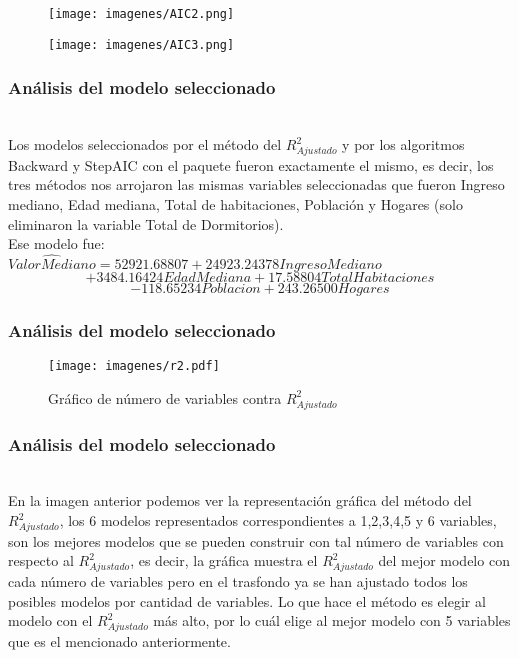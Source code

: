 \documentclass[12pt]{beamer}
\begin{document}
\begin{frame}
\begin{figure}[h]
  \centering
  \texttt{[image: imagenes/AIC2.png]}
\end{figure}
\end{frame}

\begin{frame}
\begin{figure}[h]
  \centering
  \texttt{[image: imagenes/AIC3.png]}
\end{figure}
\end{frame}

\begin{frame}
\frametitle{Análisis del modelo seleccionado}
~\\ Los modelos seleccionados por el método del $R^2_{Ajustado}$ y por los algoritmos Backward y StepAIC con el paquete fueron exactamente el mismo, es decir, los tres métodos nos arrojaron las mismas variables seleccionadas que fueron Ingreso mediano, Edad mediana, Total de habitaciones, Población y Hogares (solo eliminaron la variable Total de Dormitorios).
~\\Ese modelo fue:
~\\$\hat{ValorMediano}=52921.68807+24923.24378 IngresoMediano$
$$+ 3484.16424 EdadMediana+17.58804 TotalHabitaciones$$
$$-118.65234 Poblacion +243.26500 Hogares$$
\end{frame}

\begin{frame}
\frametitle{Análisis del modelo seleccionado}
\begin{figure}[h]
  \centering
  \texttt{[image: imagenes/r2.pdf]}
  \caption{Gráfico de número de variables contra $R^2_{Ajustado}$}\label{figura1}
\end{figure}
\end{frame}

\begin{frame}
\frametitle{Análisis del modelo seleccionado}
~\\En la imagen anterior podemos ver la representación gráfica del método del $R^2_{Ajustado}$, los 6 modelos representados correspondientes a 1,2,3,4,5 y 6 variables, son los mejores modelos que se pueden construir con tal número de variables con respecto al $R^2_{Ajustado}$, es decir, la gráfica muestra el $R^2_{Ajustado}$ del mejor modelo con cada número de variables pero en el trasfondo ya se han ajustado todos los posibles modelos por cantidad de variables. Lo que hace el método es elegir al modelo con el $R^2_{Ajustado}$ más alto, por lo cuál elige al mejor modelo con 5 variables que es el mencionado anteriormente.
\end{frame}
\end{document}
